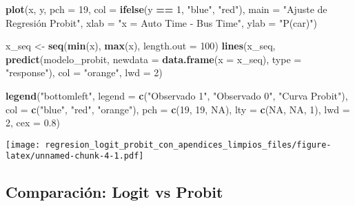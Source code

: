 \documentclass[
]{article}
\newenvironment{Shaded}{\begin{snugshade}}{\end{snugshade}}
\newcommand{\AttributeTok}[1]{\textcolor[rgb]{0.13,0.29,0.53}{#1}}
\newcommand{\ConstantTok}[1]{\textcolor[rgb]{0.56,0.35,0.01}{#1}}
\newcommand{\DecValTok}[1]{\textcolor[rgb]{0.00,0.00,0.81}{#1}}
\newcommand{\FloatTok}[1]{\textcolor[rgb]{0.00,0.00,0.81}{#1}}
\newcommand{\FunctionTok}[1]{\textcolor[rgb]{0.13,0.29,0.53}{\textbf{#1}}}
\newcommand{\NormalTok}[1]{#1}
\newcommand{\OtherTok}[1]{\textcolor[rgb]{0.56,0.35,0.01}{#1}}
\newcommand{\SpecialCharTok}[1]{\textcolor[rgb]{0.81,0.36,0.00}{\textbf{#1}}}
\newcommand{\StringTok}[1]{\textcolor[rgb]{0.31,0.60,0.02}{#1}}
\begin{document}
\begin{Shaded}
\begin{Highlighting}[]
\FunctionTok{plot}\NormalTok{(x, y, }\AttributeTok{pch =} \DecValTok{19}\NormalTok{, }\AttributeTok{col =} \FunctionTok{ifelse}\NormalTok{(y }\SpecialCharTok{==} \DecValTok{1}\NormalTok{, }\StringTok{"blue"}\NormalTok{, }\StringTok{"red"}\NormalTok{),}
     \AttributeTok{main =} \StringTok{"Ajuste de Regresión Probit"}\NormalTok{, }\AttributeTok{xlab =} \StringTok{"x = Auto Time {-} Bus Time"}\NormalTok{, }\AttributeTok{ylab =} \StringTok{"P(car)"}\NormalTok{)}

\NormalTok{x\_seq }\OtherTok{\textless{}{-}} \FunctionTok{seq}\NormalTok{(}\FunctionTok{min}\NormalTok{(x), }\FunctionTok{max}\NormalTok{(x), }\AttributeTok{length.out =} \DecValTok{100}\NormalTok{)}
\FunctionTok{lines}\NormalTok{(x\_seq, }\FunctionTok{predict}\NormalTok{(modelo\_probit, }\AttributeTok{newdata =} \FunctionTok{data.frame}\NormalTok{(}\AttributeTok{x =}\NormalTok{ x\_seq), }\AttributeTok{type =} \StringTok{"response"}\NormalTok{),}
      \AttributeTok{col =} \StringTok{"orange"}\NormalTok{, }\AttributeTok{lwd =} \DecValTok{2}\NormalTok{)}

\FunctionTok{legend}\NormalTok{(}\StringTok{"bottomleft"}\NormalTok{, }\AttributeTok{legend =} \FunctionTok{c}\NormalTok{(}\StringTok{"Observado 1"}\NormalTok{, }\StringTok{"Observado 0"}\NormalTok{, }\StringTok{"Curva Probit"}\NormalTok{),}
       \AttributeTok{col =} \FunctionTok{c}\NormalTok{(}\StringTok{"blue"}\NormalTok{, }\StringTok{"red"}\NormalTok{, }\StringTok{"orange"}\NormalTok{), }\AttributeTok{pch =} \FunctionTok{c}\NormalTok{(}\DecValTok{19}\NormalTok{, }\DecValTok{19}\NormalTok{, }\ConstantTok{NA}\NormalTok{), }\AttributeTok{lty =} \FunctionTok{c}\NormalTok{(}\ConstantTok{NA}\NormalTok{, }\ConstantTok{NA}\NormalTok{, }\DecValTok{1}\NormalTok{), }\AttributeTok{lwd =} \DecValTok{2}\NormalTok{, }\AttributeTok{cex =} \FloatTok{0.8}\NormalTok{)}
\end{Highlighting}
\end{Shaded}

\texttt{[image: regresion\_logit\_probit\_con\_apendices\_limpios\_files/figure-latex/unnamed-chunk-4-1.pdf]}

\subsection{Comparación: Logit vs
Probit}\label{comparaciuxf3n-logit-vs-probit}
\end{document}
